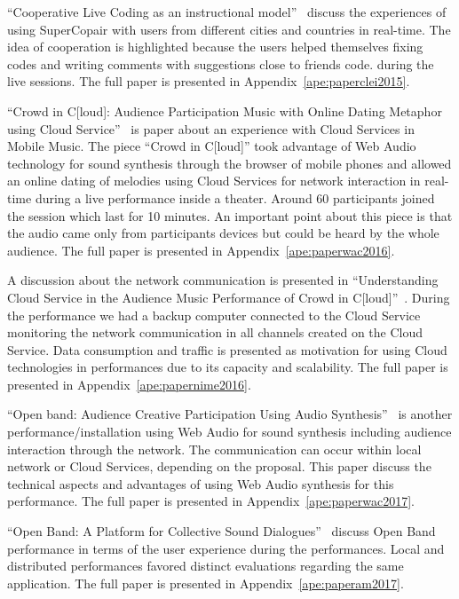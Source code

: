 ``Cooperative Live Coding as an instructional model''~\citep{deCarvalhoJunior2015cooperative} discuss the experiences of using SuperCopair with users from different cities and countries in real-time.
The idea of cooperation is highlighted because the users helped themselves fixing codes and writing comments with suggestions close to friends code. during the live sessions.
The full paper is presented in Appendix~\ref{ape:paperclei2015}.

``Crowd in C[loud]: Audience Participation Music with Online Dating Metaphor using Cloud Service''~\citep{Lee2016crowd} is paper about an experience with Cloud Services in Mobile Music.
The piece ``Crowd in C[loud]'' took advantage of Web Audio technology for sound synthesis through the browser of mobile phones and allowed an online dating of melodies using Cloud Services for network interaction in real-time during a live performance inside a theater.
Around 60 participants joined the session which last for 10 minutes.
An important point about this piece is that the audio came only from participants devices but could be heard by the whole audience.
The full paper is presented in Appendix~\ref{ape:paperwac2016}.

A discussion about the network communication is presented in ``Understanding Cloud Service in the Audience Music Performance of Crowd in C[loud]''~\citep{deCarvalhoJunior2016understanding}.
During the performance we had a backup computer connected to the Cloud Service monitoring the network communication in all channels created on the Cloud Service.
Data consumption and traffic is presented as motivation for using Cloud technologies in performances due to its capacity and scalability.
The full paper is presented in Appendix~\ref{ape:papernime2016}.

``Open band: Audience Creative Participation Using Audio Synthesis''~\citep{Stolfi2017openwac} is another performance/installation using Web Audio for sound synthesis including audience interaction through the network.
The communication can occur within local network or Cloud Services, depending on the proposal.
This paper discuss the technical aspects and advantages of using Web Audio synthesis for this performance.
The full paper is presented in Appendix~\ref{ape:paperwac2017}.

``Open Band: A Platform for Collective Sound Dialogues''~\citep{Stolfi2017openam} discuss Open Band performance in terms of the user experience during the performances.
Local and distributed performances favored distinct evaluations regarding the same application.
The full paper is presented in Appendix~\ref{ape:paperam2017}.

